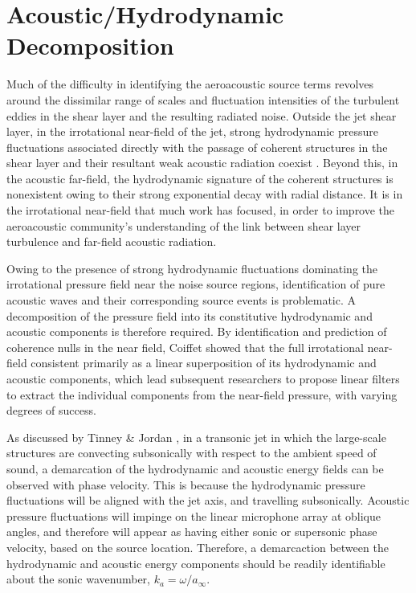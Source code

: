 \section{Acoustic/Hydrodynamic Decomposition}
Much of the difficulty in identifying the aeroacoustic source terms revolves around the dissimilar range of scales and fluctuation intensities of the turbulent eddies in the shear layer and the resulting radiated noise. 
Outside the jet shear layer, in the irrotational near-field of the jet, strong hydrodynamic pressure fluctuations associated directly with the passage of coherent structures in the shear layer and their resultant weak acoustic radiation coexist \citep{Arndt1997}. 
Beyond this, in the acoustic far-field, the hydrodynamic signature of the coherent structures is nonexistent owing to their strong exponential decay with radial distance.
It is in the irrotational near-field that much work has focused, in order to improve the aeroacoustic community's understanding of the link between shear layer turbulence and far-field acoustic radiation. 

Owing to the presence of strong hydrodynamic fluctuations dominating the irrotational pressure field near the noise source regions, identification of pure acoustic waves and their corresponding source events is problematic.
A decomposition of the pressure field into its constitutive hydrodynamic and acoustic components is therefore required. 
By identification and prediction of coherence nulls in the near field, Coiffet \etal \citep{Coiffet2006} showed that the full irrotational near-field consistent primarily as a linear superposition of its hydrodynamic and acoustic components, which lead subsequent researchers to propose linear filters to extract the individual components from the near-field pressure, with varying degrees of success. 

As discussed by Tinney \& Jordan \citep{Tinney2008}, in a transonic jet in which the large-scale structures are convecting subsonically with respect to the ambient speed of sound, a demarcation of the hydrodynamic and acoustic energy fields can be observed with phase velocity.
This is because the hydrodynamic pressure fluctuations will be aligned with the jet axis, and travelling subsonically. 
Acoustic pressure fluctuations will impinge on the linear microphone array at oblique angles, and therefore will appear as having either sonic or supersonic phase velocity, based on the source location. 
Therefore, a demarcaction between the hydrodynamic and acoustic energy components should be readily identifiable about the sonic wavenumber, $k_a = \omega / a_\infty$.

